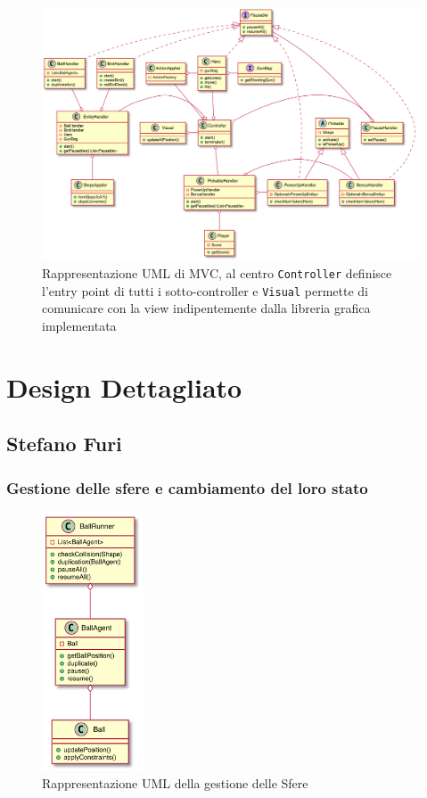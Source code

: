 \documentclass[a4paper,12pt]{report}
\begin{document}
\begin{figure}[H]
\centering{}
\includegraphics[width=16cm]{img/All.png}
\caption{Rappresentazione UML di MVC, al centro \texttt{Controller} definisce l'entry point di tutti i sotto-controller e \texttt{Visual} permette di comunicare con la view indipentemente dalla libreria grafica implementata}
\end{figure}

\section{Design Dettagliato}
\subsection{Stefano Furi}
\subsubsection{Gestione delle sfere e cambiamento del loro stato}

\begin{figure}[H]
\centering{}
\includegraphics[width=3cm]{img/BallWrapping.png}
\caption{Rappresentazione UML della gestione delle Sfere}
\end{figure}
\end{document}
